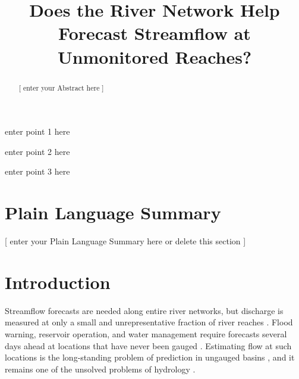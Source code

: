 \documentclass[draft]{agujournal2019}
\begin{document}
\title{Does the River Network Help Forecast Streamflow at Unmonitored Reaches?}






\begin{keypoints}
\item enter point 1 here
\item enter point 2 here
\item enter point 3 here
\end{keypoints}


\begin{abstract}
[ enter your Abstract here ]
\end{abstract}

\section*{Plain Language Summary}
[ enter your Plain Language Summary here or delete this section ]


%
%

\section{Introduction}
\label{sec:intro}

Streamflow forecasts are needed along entire river networks, but discharge is measured at only a small and unrepresentative fraction of river reaches \cite{Krabbenhoft2022}. Flood warning, reservoir operation, and water management require forecasts several days ahead at locations that have never been gauged \cite{Pagano2014,Emerton2016}. Estimating flow at such locations is the long-standing problem of prediction in ungauged basins \cite{Sivapalan2003,Hrachowitz2013,Bloschl2013}, and it remains one of the unsolved problems of hydrology \cite{Bloschl2019}.
\end{document}
